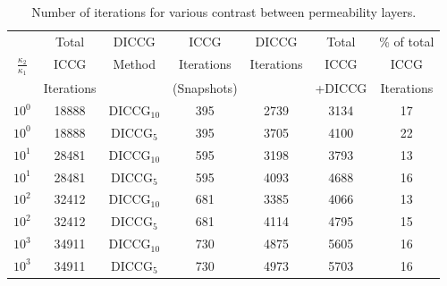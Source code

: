 \documentclass[12pt]{article}
\begin{document}
{\begin{table}[!ht]\centering
\begin{minipage}{1\textwidth}
 \centering
\begin{tabular}{ ||c|c||c|c|c|c|c||} 
\hline
&Total& DICCG & ICCG&DICCG &Total&\% of total\\ 
         $\frac{\kappa_2}{\kappa_1}$  & ICCG       & Method & Iterations & Iterations&ICCG& ICCG\\ 
                           &  Iterations&        &  (Snapshots)   & &+DICCG&Iterations \\
\hline    
$10^{0}$ &18888& DICCG$_{10}$&395&2739&3134&17 \\ 
\hline  
$10^{0}$ &18888& DICCG$_{5}$&395&3705&4100&22 \\ 
\hline   
$10^{1}$ &28481& DICCG$_{10}$&595&3198&3793&13 \\ 
\hline  
$10^{1}$ &28481& DICCG$_{5}$&595&4093&4688&16 \\ 
\hline 
$10^{2}$ &32412& DICCG$_{10}$&681&3385&4066&13 \\ 
\hline  
$10^{2}$ &32412& DICCG$_{5}$&681&4114&4795&15 \\ 
\hline 
$10^{3}$ &34911& DICCG$_{10}$&730&4875&5605&16 \\ 
\hline  
$10^{3}$ &34911& DICCG$_{5}$&730&4973&5703&16 \\ 
\hline 
\end{tabular} 
\caption{Number of iterations  for various contrast between permeability layers. }\label{table:litertotw2} 
\end{minipage}  
\end{table}  


}
\end{document}
